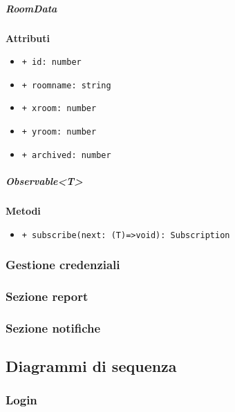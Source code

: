 \subparagraph{RoomData}
\textbf{Attributi}
\begin{itemize}
	\item \texttt{+ id: number 	}
	\item \texttt{+ roomname: string 	}
	\item \texttt{+ xroom: number 	}
	\item \texttt{+ yroom: number 	}
	\item \texttt{+ archived: number}
\end{itemize}
\subparagraph{Observable<T>}
\textbf{Metodi}
\begin{itemize}
	\item \texttt{+ subscribe(next: (T)=>void): Subscription}
\end{itemize}

\subsubsection{Gestione credenziali}
\subsubsection{Sezione report}
\subsubsection{Sezione notifiche}
\subsection{Diagrammi di sequenza}
\subsubsection{Login}
